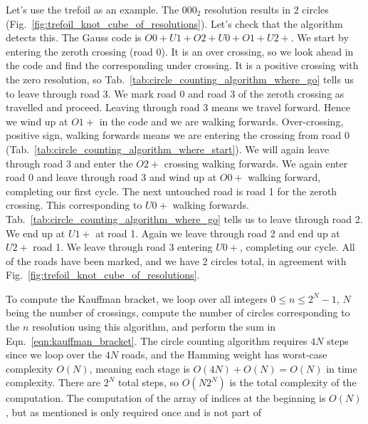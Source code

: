 \documentclass{article}
\theoremstyle{plain}
\begin{document}
        \par\hfill\par
        Let's use the trefoil as an example. The $000_{2}$ resolution results
        in 2 circles (Fig.~\ref{fig:trefoil_knot_cube_of_resolutions}). Let's
        check that the algorithm detects this. The Gauss code is
        $O0+U1+O2+U0+O1+U2+$. We start by entering the zeroth crossing
        (road 0). It is an over crossing, so we look ahead in the code and
        find the corresponding under crossing. It is a positive crossing with
        the zero resolution, so Tab.~\ref{tab:circle_counting_algorithm_where_go} tells
        us to leave through road 3. We mark road 0 and road 3 of the zeroth
        crossing as travelled and proceed. Leaving through road 3 means we
        travel forward. Hence we wind up at $O1+$ in the code and we are
        walking forwards. Over-crossing, positive sign, walking forwards means
        we are entering the crossing from road 0
        (Tab.~\ref{tab:circle_counting_algorithm_where_start}). We will again
        leave through road 3 and enter the $O2+$ crossing walking forwards.
        We again enter road 0 and leave through road 3 and wind up at
        $O0+$ walking forward, completing our first cycle. The next untouched
        road is road 1 for the zeroth crossing. This corresponding to $U0+$
        walking forwards. Tab.~\ref{tab:circle_counting_algorithm_where_go}
        tells us to leave through road 2. We end up at $U1+$ at road 1. Again
        we leave through road 2 and end up at $U2+$ road 1. We leave through
        road 3 entering $U0+$, completing our cycle. All of the roads have been
        marked, and we have 2 circles total, in agreement with
        Fig.~\ref{fig:trefoil_knot_cube_of_resolutions}.
        \par\hfill\par
        To compute the Kauffman bracket, we loop over all integers
        $0\leq{n}\leq{2}^{N}-1$, $N$ being the number of crossings, compute the
        number of circles corresponding to the $n$ resolution using this
        algorithm, and perform the sum in Eqn.~\ref{eqn:kauffman_bracket}. The
        circle counting algorithm requires $4N$ steps since we loop over the
        $4N$ roads, and the Hamming weight has worst-case complexity $O(N)$,
        meaning each stage is $O(4N)+O(N)=O(N)$ in time complexity. There are
        $2^{N}$ total steps, so $O(N2^{N})$ is the total complexity of the
        computation. The computation of the array of indices at the beginning
        is $O(N)$, but as mentioned is only required once and is not part of
\end{document}
